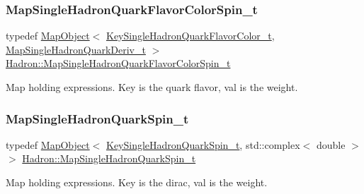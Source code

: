 \subsubsection{\texorpdfstring{MapSingleHadronQuarkFlavorColorSpin\_t}{MapSingleHadronQuarkFlavorColorSpin\_t}}
{\footnotesize\ttfamily typedef \mbox{\hyperlink{classADAT_1_1MapObject}{Map\+Object}}$<$ \mbox{\hyperlink{structHadron_1_1KeySingleHadronQuarkFlavorColor__t}{Key\+Single\+Hadron\+Quark\+Flavor\+Color\+\_\+t}}, \mbox{\hyperlink{namespaceHadron_aa588220689caea8a6aad4d0296526e6b}{Map\+Single\+Hadron\+Quark\+Deriv\+\_\+t}} $>$ \mbox{\hyperlink{namespaceHadron_a03b319764f85c20434f20a269ce5f388}{Hadron\+::\+Map\+Single\+Hadron\+Quark\+Flavor\+Color\+Spin\+\_\+t}}}



Map holding expressions. Key is the quark flavor, val is the weight. 

\mbox{\label{namespaceHadron_a22279e56b59508dc8dd2c8991dc911fd}} 
\subsubsection{\texorpdfstring{MapSingleHadronQuarkSpin\_t}{MapSingleHadronQuarkSpin\_t}}
{\footnotesize\ttfamily typedef \mbox{\hyperlink{classADAT_1_1MapObject}{Map\+Object}}$<$ \mbox{\hyperlink{structHadron_1_1KeySingleHadronQuarkSpin__t}{Key\+Single\+Hadron\+Quark\+Spin\+\_\+t}}, std\+::complex$<$ double $>$ $>$ \mbox{\hyperlink{namespaceHadron_a22279e56b59508dc8dd2c8991dc911fd}{Hadron\+::\+Map\+Single\+Hadron\+Quark\+Spin\+\_\+t}}}



Map holding expressions. Key is the dirac, val is the weight. 

\mbox{\label{namespaceHadron_a4657a351a06d86fb997a0765f97e3f13}} 
